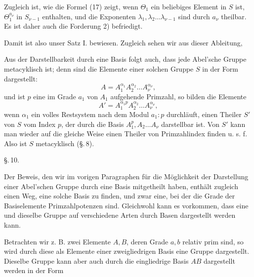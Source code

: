 Zugleich ist, wie die Formel (17) zeigt, wenn $\Theta_1$ ein beliebiges Element in $S$ ist, $\Theta_1^{a_\nu}$ in $S_{\nu-1}$ enthalten, und die Exponenten $\lambda_1, \lambda_2 \ldots \lambda_{\nu-1}$ sind durch $a_\nu$ theilbar. Es ist daher auch die Forderung 2) befriedigt.

Damit ist also unser Satz I. bewiesen. Zugleich sehen wir aus dieser Ableitung, 

Aus der Darstellbarkeit durch eine Basis folgt auch, dass jede Abel'sche Gruppe metacyklisch ist; denn sind die Elemente einer solchen Gruppe $S$ in der Form dargestellt:
\[
A = A_1^{\alpha_1} A_2^{\alpha_2} \ldots A_\nu^{\alpha_\nu},
\]
und ist $p$ eine im Grade $a_1$ von $A_1$ aufgehende Primzahl, so bilden die Elemente
\[
A' = A_1^{\alpha_1 p} A_2^{\alpha_2} \ldots A_\nu^{\alpha_\nu},
\]
wenn $\alpha_1$ ein volles Restsystem nach dem Modul $a_1 : p$ durchläuft, einen Theiler $S'$ von $S$ vom Index $p$, der durch die Basis $A_1^p, A_2 \ldots A_\nu$ darstellbar ist. Von $S'$ kann man wieder auf die gleiche Weise einen Theiler von Primzahlindex finden u. s. f. Also ist $S$ metacyklisch (\S.\,8).

\begin{center}
\S.\,10.

\end{center}

Der Beweis, den wir im vorigen Paragraphen für die Möglichkeit der Darstellung einer Abel'schen Gruppe durch eine Basis mitgetheilt haben, enthält zugleich einen Weg, eine solche Basis zu finden, und zwar eine, bei der die Grade der Basiselemente Primzahlpotenzen sind. Gleichwohl kann es vorkommen, dass eine und dieselbe Gruppe auf verschiedene Arten durch Basen dargestellt werden kann.

Betrachten wir z. B. zwei Elemente $A, B$, deren Grade $a, b$ relativ prim sind, so wird durch diese als Elemente einer zweigliedrigen Basis eine Gruppe
dargestellt. Dieselbe Gruppe kann aber auch durch die eingliedrige Basis $AB$ dargestellt werden in der Form
